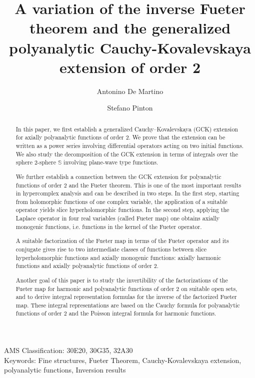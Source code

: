 \documentclass[reqno,11pt]{amsart}
\title[A variation of the inverse Fueter theorem and the generalized polyanalytic Cauchy-Kovalevskaya extension of order 2]{A variation of the inverse Fueter theorem and the generalized polyanalytic Cauchy-Kovalevskaya extension of order 2}
\author[A. De Martino]{Antonino De Martino}
\author[S. Pinton]{Stefano Pinton}
\date{}
\numberwithin{equation}{section}
\theoremstyle{definition}
\begin{document}
	
\maketitle	




\begin{abstract}
In this paper, we first establish a generalized Cauchy--Kovalevskaya (GCK) extension for axially polyanalytic functions of order $2$. We prove that the extension can be written as a power series involving differential operators acting on two initial functions. We also study the decomposition of the GCK extension in terms of integrals over the sphere 2-sphere $\mathbb{S}$ involving plane-wave type functions.

We further establish a connection between the GCK extension for polyanalytic functions of order $2$ and the Fueter theorem. This is one of the most important results in hypercomplex analysis and can be described in two steps. In the first step, starting from holomorphic functions of one complex variable, the application of a suitable operator yields slice hyperholomorphic functions. In the second step, applying the Laplace operator in four real variables (called Fueter map) one obtains axially monogenic functions, i.e. functions in the kernel of the Fueter operator.

A suitable factorization of the Fueter map in terms of the Fueter operator and its conjugate gives rise to two intermediate classes of functions between slice hyperholomorphic functions and axially monogenic functions: axially harmonic functions and axially polyanalytic functions of order $2$.

Another goal of this paper is to study the invertibility of the factorizations of the Fueter map for harmonic and polyanalytic functions of order 2 on suitable open sets, and to derive integral representation formulas for the inverse of the factorized Fueter map. These integral representations are based on the Cauchy formula for polyanalytic functions of order $2$ and the Poisson integral formula for harmonic functions.
\end{abstract}



\noindent AMS Classification: 30E20, 30G35, 32A30 \\

\noindent Keywords: Fine structures, Fueter Theorem, Cauchy-Kovalevskaya extension, polyanalytic functions, Inversion results

\tableofcontents
\end{document}
